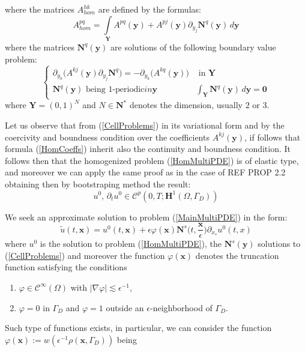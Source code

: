 where the matrices $A^{hk}_{hom}$ are defined by the formulas:
\begin{equation}
    \label{HomCoeffs}
    A^{pq}_{hom} = \int \limits_{\mathbf{Y}} A^{pq}(\mathbf{y}) + A^{pj} (\mathbf{y}) \partial_{y_j} \mathbf{N}^q (\mathbf{y}) \, d\mathbf{y}
\end{equation}
where the matrices $\mathbf{N}^q(\mathbf{y})$ are solutions of the following boundary value problem:
\begin{equation}
    \label{CellProblems}
    \left \{
    \begin{array}{ccc}
        \partial_{y_k} \big( A^{kj}(\mathbf{y}) \partial_{y_j} \mathbf{N}^q \big) = -\partial_{y_k} \big( A^{kq}(\mathbf{y}) \big) & \text{ in } \mathbf{Y} \\
        \mathbf{N}^q(\mathbf{y}) \text{ being 1-periodic} in \mathbf{y} & \int_{\mathbf{Y}}  \mathbf{N}^q (\mathbf{y}) \, d\mathbf{y} = \mathbf{0}
    \end{array}
    \right .
\end{equation}
where $\mathbf{Y} = (0,1)^N$ and $N \in \mathbf{N}^*$ denotes the dimension, usually $2$ or $3$.\\

\begin{rem}
 Let us observe that from (\ref{CellProblems}) in its variational form and by the coercivity and boundness condition over the coefficients $A^{kj}(\mathbf{y})$, if follows that formula (\ref{HomCoeffs}) inherit also the continuity and boundness condition. It follows then that the homogenized problem (\ref{HomMultiPDE}) is of elastic type, and moreover we can apply the same proof as in the case of REF PROP 2.2 obtaining then by bootstraping method the result:
 \begin{equation*}
     u^0, \, \partial_{t} u^0 \in \mathcal{C}^p (0,T; \mathbf{H}^1(\Omega, \Gamma_D))
 \end{equation*}
\end{rem}


We seek an approximate solution to problem (\ref{MainMultiPDE}) in the form:
\begin{equation}
    \label{Asymptotic}
    \tilde{u}(t,\mathbf{x}) = u^0 (t,\mathbf{x}) + \epsilon \varphi(\mathbf{x}) \mathbf{N}^{s} \big(t,\frac{\mathbf{x}}{\epsilon}) \partial_{x_s} u^0(t,x)
\end{equation}
where $u^0$ is the solution to problem (\ref{HomMultiPDE}), the $\mathbf{N}^{s} (\mathbf{y})$ solutions to (\ref{CellProblems}) and moreover the function $\varphi(\mathbf{x})$ denotes the truncation function satisfying the conditions 
\begin{enumerate}
    \item $\varphi \in \mathcal{C}^{\infty}(\Omega)$ with $\vert \nabla \varphi\vert \lesssim \epsilon^{-1}$,
    \item $\varphi = 0$ in $\Gamma_D$ and $\varphi = 1$ outside an $\epsilon$-neighborhood of $\Gamma_D$.
\end{enumerate}
Such type of functions exists, in particular, we can consider the function $\varphi(\mathbf{x}) := w(\epsilon^{-1} \rho(\mathbf{x},\Gamma_D))$ being


